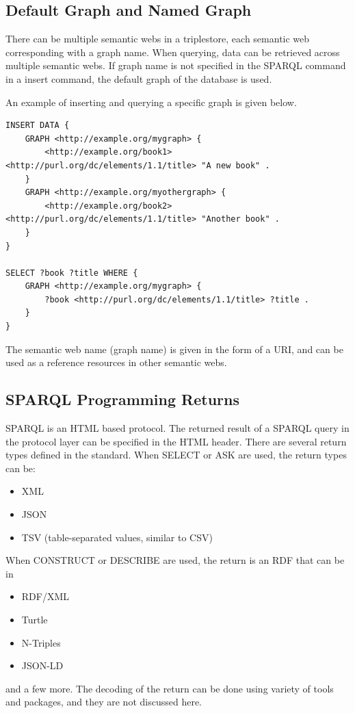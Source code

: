 \subsection{Default Graph and Named Graph}

There can be multiple semantic webs in a triplestore, each semantic web corresponding with a graph name. When querying, data can be retrieved across multiple semantic webs. If graph name is not specified in the SPARQL command in a insert command, the default graph of the database is used.

An example of inserting and querying a specific graph is given below.
\begin{lstlisting}
INSERT DATA {
	GRAPH <http://example.org/mygraph> {
		<http://example.org/book1> <http://purl.org/dc/elements/1.1/title> "A new book" .
	}
	GRAPH <http://example.org/myothergraph> {
		<http://example.org/book2> <http://purl.org/dc/elements/1.1/title> "Another book" .
	}
}

SELECT ?book ?title WHERE {
	GRAPH <http://example.org/mygraph> {
		?book <http://purl.org/dc/elements/1.1/title> ?title .
	}
}
\end{lstlisting}
The semantic web name (graph name) is given in the form of a URI, and can be used as a reference resources in other semantic webs.

\subsection{SPARQL Programming Returns}

SPARQL is an HTML based protocol. The returned result of a SPARQL query in the protocol layer can be specified in the HTML header. There are several return types defined in the standard. When SELECT or ASK are used, the return types can be:
\begin{itemize}
	\item XML
	\item JSON
	\item TSV (table-separated values, similar to CSV)
\end{itemize}
When CONSTRUCT or DESCRIBE are used, the return is an RDF that can be in
\begin{itemize}
	\item RDF/XML
	\item Turtle
	\item N-Triples
	\item JSON-LD
\end{itemize}
and a few more. The decoding of the return can be done using variety of tools and packages, and they are not discussed here.

